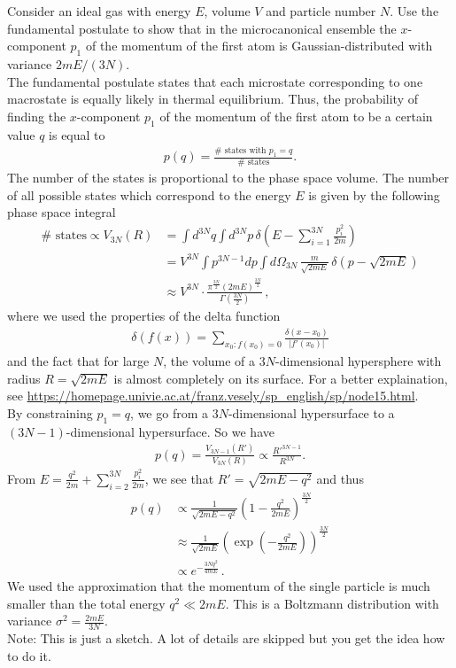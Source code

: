 Consider an ideal gas with energy $E$, volume $V$ and particle number $N$. Use the fundamental postulate
to show that in the microcanonical ensemble the $x$-component $p_1$ of the momentum of the first atom
is Gaussian-distributed with variance $2mE/(3N)$. \\

The fundamental postulate states that each microstate corresponding to one macrostate is equally likely in thermal equilibrium. Thus, the probability of finding the $x$-component $p_1$ of the momentum of the first atom to be a certain value $q$ is equal to
\begin{align}
p(q) = \frac{\#\text{ states with } p_1 = q}{\#\text{ states}}.
\end{align}
The number of the states is proportional to the phase space volume. The number of all possible states which correspond to the energy $E$ is given by the following phase space integral
\begin{align}
\#\text{ states} \propto V_{3N}(R) &= \int d^{3N}q \int d^{3N}p \, \delta\left( E - \sum_{i=1}^{3N} \frac{p_i^2}{2m} \right) \\
&= V^{3N} \int p^{3N-1} dp \int d\Omega_{3N} \, \frac{m}{\sqrt{2mE}} \, \delta\left( p - \sqrt{2mE} \right) \\
&\approx V^{3N} \cdot \frac{\pi^{\frac{3N}{2}}(2mE)^{\frac{3N}{2}}}{\Gamma\left( \frac{3N}{2} \right)} \,,
\end{align}
where we used the properties of the delta function
\begin{align}
\delta(f(x)) = \sum_{x_0: f(x_0) = 0} \frac{\delta(x-x_0)}{\vert f'(x_0)\vert}
\end{align}
and the fact that for large $N$, the volume of a $3N$-dimensional hypersphere with radius $R = \sqrt{2mE}$ is almost completely on its surface. For a better explaination, see \url{https://homepage.univie.ac.at/franz.vesely/sp_english/sp/node15.html}. \\
By constraining $p_1 = q$, we go from a $3N$-dimensional hypersurface to a $(3N-1)$-dimensional hypersurface. So we have
\begin{align}
p(q) = \frac{V_{3N-1}(R')}{V_{3N}(R)} \propto \frac{R'^{3N-1}}{R^{3N}}.
\end{align}
From $E = \frac{q^2}{2m} + \sum_{i=2}^{3N} \frac{p_i^2}{2m}$, we see that $R' = \sqrt{2mE - q^2}$ and thus
\begin{align}
p(q) &\propto \frac{1}{\sqrt{2mE-q^2}} \left( 1-\frac{q^2}{2mE} \right)^{\frac{3N}{2}} \\
&\approx \frac{1}{\sqrt{2mE}} \left( \exp\left(-\frac{q^2}{2mE}\right) \right)^{\frac{3N}{2}} \\
&\propto e^{- \frac{3Nq^2}{4mE}} \,.
\end{align}
We used the approximation that the momentum of the single particle is much smaller than the total energy $q^2 \ll 2mE$. This is a Boltzmann distribution with variance $\sigma^2 = \frac{2mE}{3N}$. \\

Note: This is just a sketch. A lot of details are skipped but you get the idea how to do it.